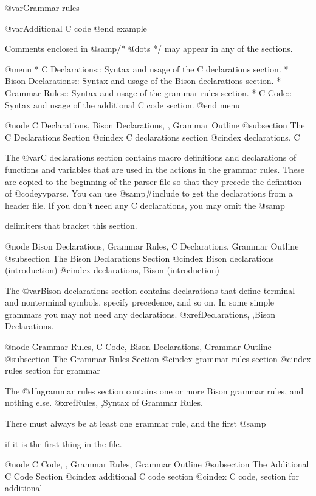 {{{{{{{{{{{{{{%
@var{Grammar rules}

@var{Additional C code}
@end example

Comments enclosed in @samp{/* @dots{} */} may appear in any of the sections.

@menu
* C Declarations::    Syntax and usage of the C declarations section.
* Bison Declarations::  Syntax and usage of the Bison declarations section.
* Grammar Rules::     Syntax and usage of the grammar rules section.
* C Code::            Syntax and usage of the additional C code section.
@end menu

@node C Declarations, Bison Declarations,  , Grammar Outline
@subsection The C Declarations Section
@cindex C declarations section
@cindex declarations, C

The @var{C declarations} section contains macro definitions and
declarations of functions and variables that are used in the actions in the
grammar rules.  These are copied to the beginning of the parser file so
that they precede the definition of @code{yyparse}.  You can use
@samp{#include} to get the declarations from a header file.  If you don't
need any C declarations, you may omit the @samp{%
delimiters that bracket this section.

@node Bison Declarations, Grammar Rules, C Declarations, Grammar Outline
@subsection The Bison Declarations Section
@cindex Bison declarations (introduction)
@cindex declarations, Bison (introduction)

The @var{Bison declarations} section contains declarations that define
terminal and nonterminal symbols, specify precedence, and so on.
In some simple grammars you may not need any declarations.
@xref{Declarations, ,Bison Declarations}.

@node Grammar Rules, C Code, Bison Declarations, Grammar Outline
@subsection The Grammar Rules Section
@cindex grammar rules section
@cindex rules section for grammar

The @dfn{grammar rules} section contains one or more Bison grammar
rules, and nothing else.  @xref{Rules, ,Syntax of Grammar Rules}.

There must always be at least one grammar rule, and the first
@samp{%
if it is the first thing in the file.

@node C Code,  , Grammar Rules, Grammar Outline
@subsection The Additional C Code Section
@cindex additional C code section
@cindex C code, section for additional

}}}}}}}}}}}}}}}}
